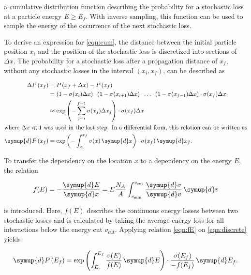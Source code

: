 a cumulative distribution function describing the probability for a stochastic loss at a particle energy $E \geq E_f$.
With inverse sampling, this function can be used to sample the energy of the occurrence of the next stochastic loss.

To derive an expression for \ref{eqn:cum}, the distance between the initial particle position $x_i$ and the position of the stochastic loss is discretized into sections of $\Delta x$.
The probability for a stochastic loss after a propagation distance of $x_f$, without any stochastic losses in the interval $\left(x_i, x_f\right)$, can be described as

\begin{equation}
	\label{eqn:discrete}
	\begin{split}
	\Delta P\left(x_f\right) &= P\left( x_f + \Delta x \right) - P\left( x_f \right)\\
	&= \left( 1 - \sigma(x_i) \Delta x \right) \cdot \left( 1 - \sigma(x_{i+1}) \Delta x \right) \cdot\ldots\cdot \left( 1 - \sigma(x_{f-1}) \Delta x \right) \cdot \sigma(x_f) \Delta x \\
	&\approx \exp \left( - \sum_{j=i}^{f-1} \sigma(x_j) \Delta x_j \right) \cdot \sigma(x_f) \Delta x\\
	\intertext{where $\Delta x \ll 1$ was used in the last step. In a differential form, this relation can be written as}
	\symup{d}P\left( x_f \right) &= \exp\left(-\int_{x_i}^{x_f} \sigma(x) \, \symup{d}x \right) \cdot \sigma(x_f) \, \symup{d} x_f.
	\end{split}
\end{equation}

To transfer the dependency on the location $x$ to a dependency on the energy $E$, the relation

\begin{equation}
	\label{eqn:fE}
	f(E) = -\frac{\symup{d}E}{\symup{d}x} = E \frac{N_A}{A} \int_{v_\text{min}}^{v_\text{cut}} \frac{\symup{d}\sigma}{\symup{d}v} \, \symup{d}v
\end{equation}

is introduced.
Here, $f(E)$ describes the continuous energy losses between two stochastic losses and is calculated by taking the average energy loss for all interactions below the energy cut $v_\text{cut}$.
Applying relation \ref{eqn:fE} on \ref{eqn:discrete} yields

\begin{equation}
	\label{eqn:discrete_energy}
	\symup{d}P\left(E_f\right) = \exp \left( \int_{E_i}^{E_f} \frac{\sigma(E)}{ f(E) } \, \symup{d}E \right) \cdot \frac{\sigma(E_f)}{-f(E_f)} \, \symup{d}E_f.
\end{equation}


